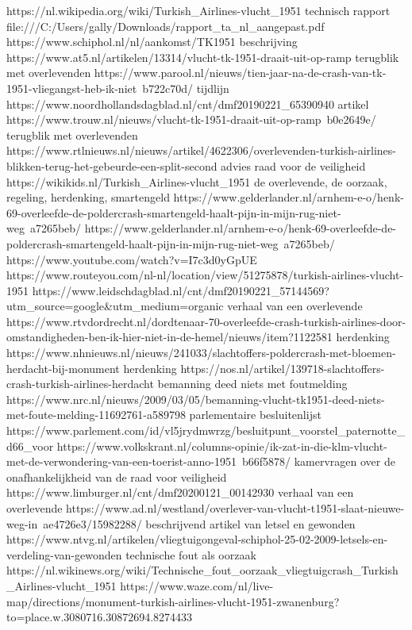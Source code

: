 https://nl.wikipedia.org/wiki/Turkish_Airlines-vlucht_1951
technisch rapport
file:///C:/Users/gally/Downloads/rapport_ta_nl_aangepast.pdf
https://www.schiphol.nl/nl/aankomst/TK1951
beschrijving
https://www.at5.nl/artikelen/13314/vlucht-tk-1951-draait-uit-op-ramp
terugblik met overlevenden
https://www.parool.nl/nieuws/tien-jaar-na-de-crash-van-tk-1951-vliegangst-heb-ik-niet~b722c70d/
tijdlijn
https://www.noordhollandsdagblad.nl/cnt/dmf20190221_65390940
artikel
https://www.trouw.nl/nieuws/vlucht-tk-1951-draait-uit-op-ramp~b0e2649e/
terugblik met overlevenden
https://www.rtlnieuws.nl/nieuws/artikel/4622306/overlevenden-turkish-airlines-blikken-terug-het-gebeurde-een-split-second
advies raad voor de veiligheid
https://wikikids.nl/Turkish_Airlines-vlucht_1951
de overlevende, de oorzaak, regeling, herdenking, smartengeld
https://www.gelderlander.nl/arnhem-e-o/henk-69-overleefde-de-poldercrash-smartengeld-haalt-pijn-in-mijn-rug-niet-weg~a7265beb/
https://www.gelderlander.nl/arnhem-e-o/henk-69-overleefde-de-poldercrash-smartengeld-haalt-pijn-in-mijn-rug-niet-weg~a7265beb/
https://www.youtube.com/watch?v=I7c3d0yGpUE
https://www.routeyou.com/nl-nl/location/view/51275878/turkish-airlines-vlucht-1951
https://www.leidschdagblad.nl/cnt/dmf20190221_57144569?utm_source=google&utm_medium=organic
verhaal van een overlevende
https://www.rtvdordrecht.nl/dordtenaar-70-overleefde-crash-turkish-airlines-door-omstandigheden-ben-ik-hier-niet-in-de-hemel/nieuws/item?1122581
herdenking
https://www.nhnieuws.nl/nieuws/241033/slachtoffers-poldercrash-met-bloemen-herdacht-bij-monument
herdenking
https://nos.nl/artikel/139718-slachtoffers-crash-turkish-airlines-herdacht
bemanning deed niets met foutmelding
https://www.nrc.nl/nieuws/2009/03/05/bemanning-vlucht-tk1951-deed-niets-met-foute-melding-11692761-a589798
parlementaire besluitenlijst
https://www.parlement.com/id/vl5jrydmwrzg/besluitpunt_voorstel_paternotte_d66_voor
https://www.volkskrant.nl/columns-opinie/ik-zat-in-die-klm-vlucht-met-de-verwondering-van-een-toerist-anno-1951~b66f5878/
kamervragen over de onafhankelijkheid van de raad voor veiligheid
https://www.limburger.nl/cnt/dmf20200121_00142930
verhaal van een overlevende
https://www.ad.nl/westland/overlever-van-vlucht-t1951-slaat-nieuwe-weg-in~ae4726e3/15982288/
beschrijvend artikel van letsel en gewonden
https://www.ntvg.nl/artikelen/vliegtuigongeval-schiphol-25-02-2009-letsels-en-verdeling-van-gewonden
technische fout als oorzaak
https://nl.wikinews.org/wiki/Technische_fout_oorzaak_vliegtuigcrash_Turkish_Airlines-vlucht_1951
https://www.waze.com/nl/live-map/directions/monument-turkish-airlines-vlucht-1951-zwanenburg?to=place.w.3080716.30872694.8274433
